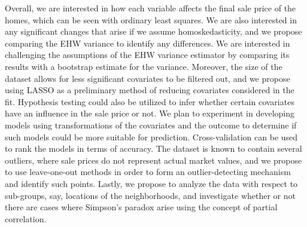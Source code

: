 \documentclass{article}
\begin{document}
Overall, we are interested in how each variable affects the final sale price of the homes, which can be seen with ordinary least squares.
We are also interested in any significant changes that arise if we assume homoskedasticity, and we propose comparing the EHW variance to identify any differences.
    We are interested in challenging the assumptions of the EHW variance estimator by comparing its results with a bootstrap estimate for the variance.
Moreover, the size of the dataset allows for less significant covariates to be filtered out, and we propose using LASSO as a preliminary method of reducing covariates considered in the fit.
    Hypothesis testing could also be utilized to infer whether certain covariates have an influence in the sale price or not.
We plan to experiment in developing models using transformations of the covariates and the outcome to determine if such models could be more suitable for prediction.
    Cross-validation can be used to rank the models in terms of accuracy.
The dataset is known to contain several outliers, where sale prices do not represent actual market values, and we propose to use leave-one-out methods in order to form an outlier-detecting mechanism and identify such points.
Lastly, we propose to analyze the data with respect to sub-groups, say, locations of the neighborhoods, and investigate whether or not there are cases where Simpson's paradox arise using the concept of partial correlation.


\printbibliography
\end{document}
